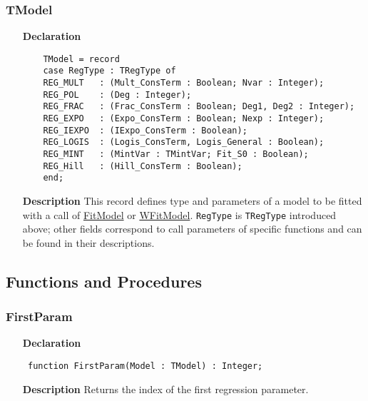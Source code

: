 \documentclass[12pt,a4paper,oneside]{report}
\newcommand{\declarationitem}[1]{\textbf{#1}}
\newcommand{\descriptiontitle}[1]{\textbf{#1}}
\newcommand{\code}[1]{\texttt{#1}}
\begin{document}
\subsubsection{TModel}
\label{umodels-TModel}
\begin{itemize}
	\item[\declarationitem{Declaration}\hfill]
	
	\begin{verbatim}
	TModel = record
	case RegType : TRegType of
	REG_MULT   : (Mult_ConsTerm : Boolean; Nvar : Integer);
	REG_POL    : (Deg : Integer);
	REG_FRAC   : (Frac_ConsTerm : Boolean; Deg1, Deg2 : Integer);
	REG_EXPO   : (Expo_ConsTerm : Boolean; Nexp : Integer);
	REG_IEXPO  : (IExpo_ConsTerm : Boolean);
	REG_LOGIS  : (Logis_ConsTerm, Logis_General : Boolean);
	REG_MINT   : (MintVar : TMintVar; Fit_S0 : Boolean);
	REG_Hill   : (Hill_ConsTerm : Boolean);
	end;
	\end{verbatim}			
	\item[\descriptiontitle{Description}]
	This record defines type and parameters of a model to be fitted with a call of \hyperref[umodels-FitModel]{FitModel} or \hyperref[umodels-WFitModel]{WFitModel}. \code{RegType} is \code{TRegType} introduced above; other fields correspond to call parameters of specific functions and can be found in their descriptions. 
\end{itemize}

\subsection{Functions and Procedures}
\subsubsection{FirstParam}
\label{umodels-FirstParam}
\begin{itemize}\item[\declarationitem{Declaration}\hfill]
	\begin{flushleft}
		\code{
			function FirstParam(Model : TModel) : Integer;}
		
	\end{flushleft}
	
	\par
	\item[\descriptiontitle{Description}]
	Returns the index of the first regression parameter. 	
\end{itemize}
\end{document}
